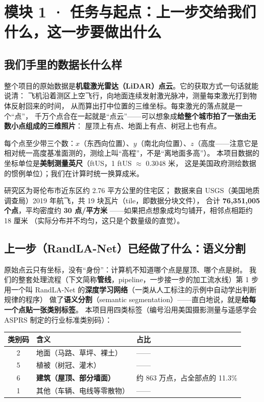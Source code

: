 \section{模块 1 · 任务与起点：上一步交给我们什么，这一步要做出什么}

\subsection{我们手里的数据长什么样}

整个项目的原始数据是\textbf{机载激光雷达（LiDAR）点云}。它的获取方式一句话就能说清：
飞机沿着测区上空飞行，向地面连续发射激光脉冲，测量每束激光打到物体反射回来的时间，
从而算出打中位置的三维坐标。每束激光的落点就是一个``点''，
千万个点合在一起就是``点云''——可以想象成\textbf{给整个城市拍了一张由无数小点组成的三维照片}：
屋顶上有点、地面上有点、树冠上也有点。

每个点至少带三个数：$x$（东西向位置）、$y$（南北向位置）、$z$（高度——注意它是
相对统一高度基准面测的，测绘上叫``高程''，不是``离地面多高''）。
本项目数据的坐标单位是\textbf{美制测量英尺}（ftUS，1 ftUS $\approx$ 0.3048 米，
这是美国政府测绘数据的惯例单位）；我们在计算时统一换算成米。

\begin{numbox}[：本项目的原始数据]
研究区为哥伦布市近东区约 2.76 平方公里的住宅区；
数据来自 USGS（美国地质调查局）2019 年航飞，共 19 块瓦片（tile，即数据分块文件），
合计 \textbf{76{,}351{,}005 个点}，平均密度约 \textbf{30 点/平方米}
——如果把点想象成均匀铺开，相邻点相距约 18 厘米
（实际分布并不均匀，这只是个数量级的直觉）。
\end{numbox}

\subsection{上一步（RandLA-Net）已经做了什么：语义分割}

原始点云只有坐标，没有``身份''：计算机不知道哪个点是屋顶、哪个点是树。
我们的整套处理流程（下文简称\textbf{管线}，pipeline，一步接一步的加工流水线）第 1 步
用一个叫 RandLA-Net 的\textbf{深度学习网络}（一类从人工标注的示例中自动学出判断规律的程序）
做了\textbf{语义分割}（semantic segmentation）——直白地说，就是\textbf{给每一个点贴一张类别标签}。
本项目用四类标签（编号沿用美国摄影测量与遥感学会 ASPRS 制定的行业标准类别码）：

\begin{center}
\begin{tabular}{cll}
\toprule
类别码 & 含义 & 占比 \\
\midrule
2 & 地面（马路、草坪、裸土） & —— \\
5 & 植被（树冠、灌木） & —— \\
6 & \textbf{建筑（屋顶、部分墙面）} & 约 863 万点，占全部点的 11.3\% \\
1 & 其他（车辆、电线等零散物） & —— \\
\bottomrule
\end{tabular}
\end{center}

